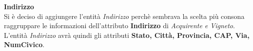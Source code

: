 \begin{flushleft}
	\textbf{\large{Indirizzo}}\\
	Si è deciso di aggiungere l'entità \emph{Indirizzo} perchè sembrava la scelta più consona raggruppare le informazioni dell'attributo \textbf{Indirizzo} di \emph{Acquirente e Vigneto}. L'entità \emph{Indirizzo} avrà quindi gli attributi \textbf{Stato, Città, Provincia, CAP, Via, NumCivico}.
\end{flushleft}